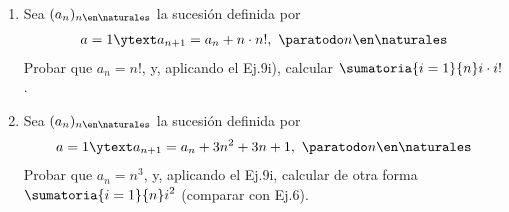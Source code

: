 \begin{enunciado}{\ejercicio}
    \begin{enumerate}[label=\roman*)]
        \item Sea $(a_n)_{n \en \naturales }$ la sucesión definida por
        \begin{align*}
            a = 1  \ytext  a_{n+1} = a_n + n \cdot n!,\ \paratodo n \en \naturales 
        \end{align*}
        Probar que $a_n = n!$, y, aplicando el Ej.9i), calcular $\displaystyle \sumatoria{i=1}{n} i \cdot i!$.
        
        \item Sea $(a_n)_{n \en \naturales }$ la sucesión definida por
        \begin{align*}
            a = 1  \ytext  a_{n+1} = a_n + 3n^2 + 3n + 1,\ \paratodo n \en \naturales 
        \end{align*}
        Probar que $a_n = n^3$, y, aplicando el Ej.9i, calcular de otra forma $\displaystyle \sumatoria{i=1}{n} i^2$ 
        (comparar con Ej.6).
    \end{enumerate}
\end{enunciado}

